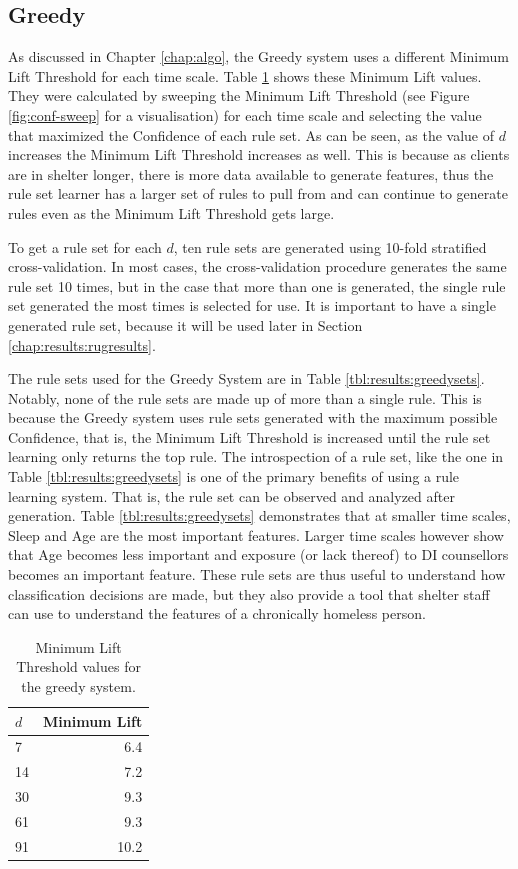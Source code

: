 \subsection{Greedy}
As discussed in Chapter \ref{chap:algo}, the Greedy system uses a different Minimum Lift Threshold for each time scale. Table \ref{tbl:results:mltgreedy} shows these Minimum Lift values. They were calculated by sweeping the Minimum Lift Threshold (see Figure \ref{fig:conf-sweep} for a visualisation) for each time scale and selecting the value that maximized the Confidence of each rule set. As can be seen, as the value of $d$ increases the Minimum Lift Threshold increases as well. This is because as clients are in shelter longer, there is more data available to generate features, thus the rule set learner has a larger set of rules to pull from and can continue to generate rules even as the Minimum Lift Threshold gets large.

To get a rule set for each $d$, ten rule sets are generated using 10-fold stratified cross-validation. In most cases, the cross-validation procedure generates the same rule set 10 times, but in the case that more than one is generated, the single rule set generated the most times is selected for use. It is important to have a single generated rule set, because it will be used later in Section \ref{chap:results:rugresults}.

The rule sets used for the Greedy System are in Table \ref{tbl:results:greedysets}. Notably, none of the rule sets are made up of more than a single rule. This is because the Greedy system uses rule sets generated with the maximum possible Confidence, that is, the Minimum Lift Threshold is increased until the rule set learning only returns the top rule. The introspection of a rule set, like the one in Table \ref{tbl:results:greedysets} is one of the primary benefits of using a rule learning system. That is, the rule set can be observed and analyzed after generation.
Table \ref{tbl:results:greedysets} demonstrates that at smaller time scales, Sleep and Age are the most important features. Larger time scales however show that Age becomes less important and exposure (or lack thereof) to DI counsellors becomes an important feature. These rule sets are thus useful to understand how classification decisions are made, but they also provide a tool that shelter staff can use to understand the features of a chronically homeless person.

\begin{table}[h]
	\centering

	\begin{tabular}{lr}
	\toprule
	{$d$} &  Minimum Lift \\
	\midrule
	7     & 6.4 \\
	14    & 7.2 \\
	30    & 9.3 \\
	61    & 9.3 \\
	91    & 10.2 \\

	\bottomrule
	\end{tabular}

	\caption{Minimum Lift Threshold values for the greedy system.}
	\label{tbl:results:mltgreedy}
\end{table}


